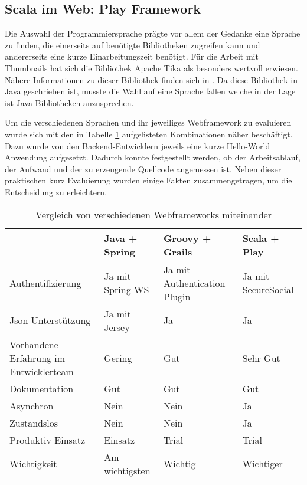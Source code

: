 \subsection{Scala im Web: Play Framework}
Die Auswahl der Programmiersprache prägte vor allem der Gedanke eine Sprache zu finden, die einerseits auf benötigte Bibliotheken zugreifen kann und andererseits eine kurze Einarbeitungszeit benötigt. Für die Arbeit mit Thumbnails hat sich die Bibliothek Apache Tika als besonders wertvoll erwiesen. Nähere Informationen zu dieser Bibliothek finden sich in \cite{bp-dome}. Da diese Bibliothek in Java geschrieben ist, musste die Wahl auf eine Sprache fallen welche in der Lage ist Java Bibliotheken anzusprechen. 

Um die verschiedenen Sprachen und ihr jeweiliges Webframework zu evaluieren wurde sich mit den in Tabelle \ref{tab:FrameWorkVergleich} aufgelisteten Kombinationen näher beschäftigt. Dazu wurde von den Backend-Entwicklern jeweils eine kurze Hello-World Anwendung aufgesetzt. Dadurch konnte festgestellt werden, ob der Arbeitsablauf, der Aufwand und der zu erzeugende Quellcode angemessen ist. Neben dieser praktischen kurz Evaluierung wurden einige Fakten zusammengetragen, um die Entscheidung zu erleichtern.

\begin{table}
  \begin{tabularx}{\textwidth}{|X|l|l|l|}
    \hline
    ~                                      & Java + Spring    & Groovy + Grails              & Scala + Play        \\\hline
    Authentifizierung                      & Ja mit Spring-WS & Ja mit Authentication Plugin & Ja mit SecureSocial \\\hline
    Json Unterstützung                     & Ja mit Jersey    & Ja                           & Ja                  \\\hline
    Vorhandene Erfahrung im Entwicklerteam & Gering           & Gut                          & Sehr Gut            \\\hline
    Dokumentation                          & Gut              & Gut                          & Gut                 \\\hline
    Asynchron                              & Nein             & Nein                         & Ja                  \\\hline
    Zustandslos                            & Nein             & Nein                         & Ja                  \\\hline
    Produktiv Einsatz                      & Einsatz          & Trial                        & Trial               \\\hline
    Wichtigkeit                            & Am wichtigsten   & Wichtig                      & Wichtiger           \\\hline
  \end{tabularx}
  \caption {Vergleich von verschiedenen Webframeworks miteinander}
  \label{tab:FrameWorkVergleich}
\end{table}

